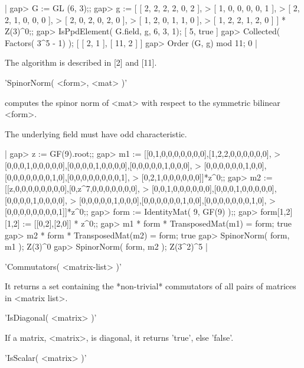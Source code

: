 |    gap> G := GL (6, 3);; 
    gap> g := [ [ 2, 2, 2, 2, 0, 2 ],
    >           [ 1, 0, 0, 0, 0, 1 ],
    >           [ 2, 2, 1, 0, 0, 0 ], 
    >           [ 2, 0, 2, 0, 2, 0 ],
    >           [ 1, 2, 0, 1, 1, 0 ],
    >           [ 1, 2, 2, 1, 2, 0 ] ] * Z(3)^0;;
    gap> IsPpdElement( G.field, g, 6, 3, 1);
    [ 5, true ]
    gap> Collected( Factors( 3^5 - 1) );
    [ [ 2, 1 ], [ 11, 2 ] ]
    gap> Order (G, g) mod 11;
    0 |

The algorithm is described in [2] and [11].


'SpinorNorm( <form>, <mat> )'

computes the spinor norm  of <mat> with respect  to the symmetric bilinear
<form>.

The underlying field must have odd characteristic.

|    gap> z  := GF(9).root;;
    gap> m1 := [[0,1,0,0,0,0,0,0,0],[1,2,2,0,0,0,0,0,0],
    >  [0,0,0,1,0,0,0,0,0],[0,0,0,0,1,0,0,0,0],[0,0,0,0,0,1,0,0,0],
    >  [0,0,0,0,0,0,1,0,0],[0,0,0,0,0,0,0,1,0],[0,0,0,0,0,0,0,0,1],
    >  [0,2,1,0,0,0,0,0,0]]*z^0;;
    gap> m2 := [[z,0,0,0,0,0,0,0,0],[0,z^7,0,0,0,0,0,0,0],
    >  [0,0,1,0,0,0,0,0,0],[0,0,0,1,0,0,0,0,0],[0,0,0,0,1,0,0,0,0],
    >  [0,0,0,0,0,1,0,0,0],[0,0,0,0,0,0,1,0,0],[0,0,0,0,0,0,0,1,0],
    >  [0,0,0,0,0,0,0,0,1]]*z^0;;
    gap> form := IdentityMat( 9, GF(9) );;
    gap> form{[1,2]}{[1,2]} := [[0,2],[2,0]] * z^0;;
    gap> m1 * form * TransposedMat(m1) = form;
    true
    gap> m2 * form * TransposedMat(m2) = form; 
    true
    gap> SpinorNorm( form, m1 );
    Z(3)^0
    gap> SpinorNorm( form, m2 );
    Z(3^2)^5 |
    
%
%
%
%
%
%
%
%
%

'Commutators( <matrix-list> )'

It returns a set containing the *non-trivial* commutators of all pairs of
matrices in <matrix list>.

'IsDiagonal( <matrix> )'

If a matrix, <matrix>, is diagonal, it returns 'true', else 'false'.

'IsScalar( <matrix> )'

